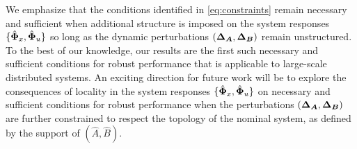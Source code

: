 We emphasize that the conditions identified in \eqref{eq:constraints} remain necessary and sufficient when additional structure is imposed on the system responses $\{\hat{\boldsymbol{\Phi}}_x,\hat{\boldsymbol{\Phi}}_u\}$ so long as the dynamic perturbations $({\boldsymbol{\Delta}}_{\boldsymbol{A}},{\boldsymbol{\Delta}}_{\boldsymbol{B}})$ remain unstructured.  To the best of our knowledge, our results are the first such necessary and sufficient conditions for robust performance that is applicable to large-scale distributed systems.  An exciting direction for future work will be to explore the consequences of locality in the system responses $\{\hat{\boldsymbol{\Phi}}_x,\hat{\boldsymbol{\Phi}}_u\}$ on necessary and sufficient conditions for robust performance when the perturbations $({\boldsymbol{\Delta}}_{\boldsymbol{A}},{\boldsymbol{\Delta}}_{\boldsymbol{B}})$ are further constrained to respect the topology of the nominal system, as defined by the support of $(\hat A, \hat B)$.
%
